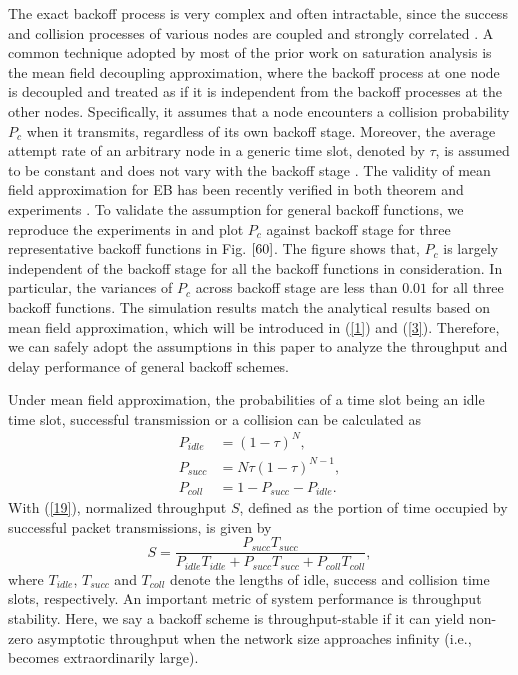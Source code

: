 \documentclass[journal]{IEEEtran}
\begin{document}
The exact backoff process is very complex and often intractable, since the success and collision processes of various nodes are coupled and strongly correlated \cite{2008:Benaim}. A common technique adopted by most of the prior work on saturation analysis is the mean field decoupling approximation, where the backoff process at one node is decoupled and treated as if it is independent from the backoff processes at the other nodes. Specifically, it assumes that a node encounters a collision probability $P_c$ when it transmits, regardless of its own backoff stage. Moreover, the average attempt rate of an arbitrary node in a generic time slot, denoted by $\tau$, is assumed to be constant and does not vary with the backoff stage \cite{2000:Bianchi}. The validity of mean field approximation for EB has been recently verified in both theorem and experiments \cite{2009:Cho,2010:Huang}. To validate the assumption for general backoff functions, we reproduce the experiments in \cite{2010:Huang} and plot $P_c$ against backoff stage for three representative backoff functions in Fig. $\ref{60}$. The figure shows that, $P_c$ is largely independent of the backoff stage for all the backoff functions in consideration. In particular, the variances of $P_c$ across backoff stage are less than $0.01$ for all three backoff functions. The simulation results match the analytical results based on mean field approximation, which will be introduced in (\ref{1}) and (\ref{3}). Therefore, we can safely adopt the assumptions in this paper to analyze the throughput and delay performance of general backoff schemes.

Under mean field approximation, the probabilities of a time slot being an idle time slot, successful transmission or a collision can be calculated as
\begin{equation}
\label{19}
\begin{aligned}
P_{idle}&=\left(1-\tau\right)^N,\\
P_{succ}&=N \tau \left(1-\tau\right)^{N-1},\\
P_{coll}&=1-P_{succ}-P_{idle}.
\end{aligned}
\end{equation}
With (\ref{19}), normalized throughput $S$, defined as the portion of time occupied by successful packet transmissions, is given by
\begin{equation}
\label{49}
S=\frac{P_{succ}T_{succ}}{P_{idle}T_{idle} + P_{succ}T_{succ} +P_{coll}T_{coll}},
\end{equation}
where $T_{idle}$, $T_{succ}$ and $T_{coll}$ denote the lengths of idle, success and collision time slots, respectively. An important metric of system performance is throughput stability. Here, we say a backoff scheme is throughput-stable if it can yield non-zero asymptotic throughput when the network size approaches infinity (i.e., becomes extraordinarily large).
\end{document}

